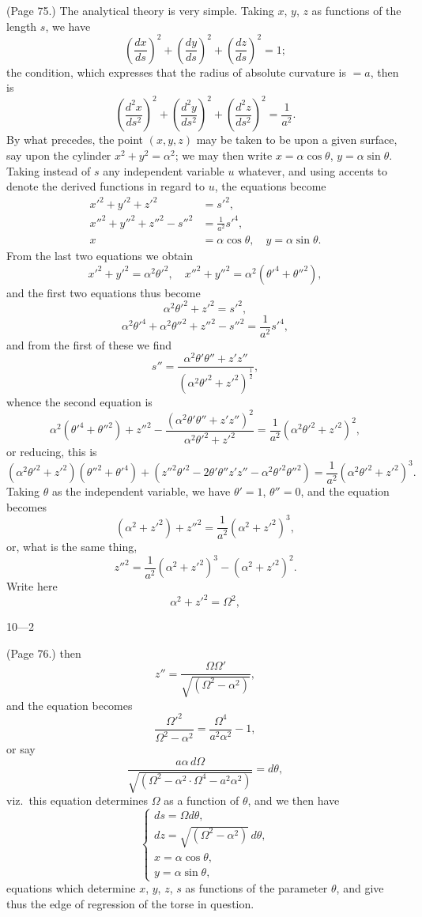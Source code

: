 \documentclass[11pt,a4paper]{article}
\begin{document}
\bigskip

\noindent (Page 75.) The analytical theory is very simple. Taking $x$, $y$, $z$ as functions of the length $s$, we have
\[
\left(\frac{dx}{ds}\right)^2 + \left(\frac{dy}{ds}\right)^2 + \left(\frac{dz}{ds}\right)^2 = 1;
\]
the condition, which expresses that the radius of absolute curvature is $= a$, then is
\[
\left(\frac{d^2 x}{ds^2}\right)^2 + \left(\frac{d^2 y}{ds^2}\right)^2 + \left(\frac{d^2 z}{ds^2}\right)^2 = \frac{1}{a^2}.
\]
By what precedes, the point $(x, y, z)$ may be taken to be upon a given surface, say upon the cylinder $x^2 + y^2 = \alpha^2$; we may then write $x = \alpha\cos\theta$, $y = \alpha\sin\theta$. Taking instead of $s$ any independent variable $u$ whatever, and using accents to denote the derived functions in regard to $u$, the equations become
\begin{align*}
x'^2 + y'^2 + z'^2 &= s'^2, \\
x''^2 + y''^2 + z''^2 - s''^2 &= \frac{1}{a^2} s'^4, \\
x &= \alpha\cos\theta,\quad y = \alpha\sin\theta.
\end{align*}
From the last two equations we obtain
\[
x'^2 + y'^2 = \alpha^2 \theta'^2,\quad x''^2 + y''^2 = \alpha^2 (\theta'^4 + \theta''^2),
\]
and the first two equations thus become
\[
\alpha^2 \theta'^2 + z'^2 = s'^2,
\]
\[
\alpha^2 \theta'^4 + \alpha^2 \theta''^2 + z''^2 - s''^2 = \frac{1}{a^2} s'^4,
\]
and from the first of these we find
\[
s'' = \frac{\alpha^2 \theta' \theta'' + z' z''}{(\alpha^2 \theta'^2 + z'^2)^{\tfrac{1}{2}}},
\]
whence the second equation is
\[
\alpha^2 (\theta'^4 + \theta''^2) + z''^2 - \frac{(\alpha^2 \theta' \theta'' + z' z'')^2}{\alpha^2 \theta'^2 + z'^2} = \frac{1}{a^2} (\alpha^2 \theta'^2 + z'^2)^2,
\]
or reducing, this is
\[
(\alpha^2 \theta'^2 + z'^2)(\theta''^2 + \theta'^4) + (z''^2 \theta'^2 - 2\theta' \theta'' z' z'' - \alpha^2 \theta'^2 \theta''^2) = \frac{1}{a^2}(\alpha^2 \theta'^2 + z'^2)^3.
\]
Taking $\theta$ as the independent variable, we have $\theta' = 1$, $\theta'' = 0$, and the equation becomes
\[
(\alpha^2 + z'^2) + z''^2 = \frac{1}{a^2}(\alpha^2 + z'^2)^3,
\]
or, what is the same thing,
\[
z''^2 = \frac{1}{a^2}(\alpha^2 + z'^2)^3 - (\alpha^2 + z'^2)^2.
\]
Write here
\[
\alpha^2 + z'^2 = \Omega^2,
\]

\hfill 10---2

\bigskip

\noindent (Page 76.) then
\[
z'' = \frac{\Omega\Omega'}{\sqrt{(\Omega^2 - \alpha^2)}},
\]
and the equation becomes
\[
\frac{\Omega'^2}{\Omega^2 - \alpha^2} = \frac{\Omega^4}{a^2 \alpha^2} - 1,
\]
or say
\[
\frac{a\alpha\, d\Omega}{\sqrt{(\Omega^2 - \alpha^2 \cdot \Omega^4 - a^2 \alpha^2)}} = d\theta,
\]
viz.\ this equation determines $\Omega$ as a function of $\theta$, and we then have
\[
\begin{cases}
ds = \Omega d\theta, \\
dz = \sqrt{(\Omega^2 - \alpha^2)}\, d\theta, \\
x = \alpha\cos\theta, \\
y = \alpha\sin\theta,
\end{cases}
\]
equations which determine $x$, $y$, $z$, $s$ as functions of the parameter $\theta$, and give thus the edge of regression of the torse in question.
\end{document}
